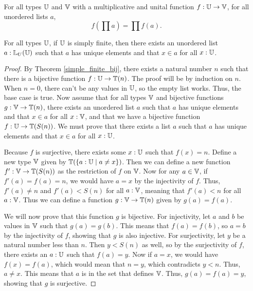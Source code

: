 \documentclass[../../math.tex]{subfiles}
\begin{document}
\begin{theorem} \label{ulist_prod_homo}
    For all types $\mathbb{U}$ and $\mathbb{V}$ with a multiplicative and unital function $f :
    \mathbb{U} \to \mathbb{V}$, for all unordered lists $a$,
    \[
        f\left( \prod a \right) = \prod f(a).
    \]
\end{theorem}

\begin{theorem} \label{ulist_finite}
    For all types $\mathbb{U}$, if $\mathbb{U}$ is simply finite, then there exists an unordered
    list $a : \mathbb{L}_U(\mathbb{U})$ such that $a$ has unique elements and that $x \in a$ for
    all $x : \mathbb{U}$.
\end{theorem}
\begin{proof}
    By Theorem \ref{simple_finite_bij}, there exists a natural number $n$ such
    that there is a bijective function $f : \mathbb{U} \to \mathbb{T}(n)$.  The proof will be by
    induction on $n$.  When $n = 0$, there can't be any values in $\mathbb{U}$, so the
    empty list works.  Thus, the base case is true.  Now assume that for all
    types $\mathbb{V}$ and bijective functions $g : \mathbb{V} \to \mathbb{T}(n)$, there exists an
    unordered list $a$ such that $a$ has unique elements and that $x \in a$ for
    all $x : \mathbb{V}$, and that we have a bijective function $f : \mathbb{U} \to \mathbb{T}(S(n))$.
    We must prove that there exists a list $a$ such that $a$ has unique elements
    and that $x \in a$ for all $x : \mathbb{U}$.

    Because $f$ is surjective, there exists some $x : \mathbb{U}$ such that $f(x) = n$.
    Define a new type $\mathbb{V}$ given by $\mathbb{T}(\{a : \mathbb{U} \mid a \neq x\})$.  Then we can
    define a new function $f' : \mathbb{V} \to \mathbb{T}(S(n))$ as the restriction of $f$ on
    $\mathbb{V}$.  Now for any $a \in \mathbb{V}$, if $f'(a) = f(a) = n$, we would have $a = x$
    by the injectivity of $f$.  Thus, $f'(a) \neq n$ and $f'(a) < S(n)$ for all
    $a : \mathbb{V}$, meaning that $f'(a) < n$ for all $a : \mathbb{V}$.  Thus we can define a
    function $g : \mathbb{V} \to \mathbb{T}(n)$ given by $g(a) = f(a)$.

    We will now prove that this function $g$ is bijective.  For injectivity, let
    $a$ and $b$ be values in $\mathbb{V}$ such that $g(a) = g(b)$.  This means that
    $f(a) = f(b)$, so $a = b$ by the injectivity of $f$, showing that $g$ is
    also injective.  For surjectivity, let $y$ be a natural number less than
    $n$.  Then $y < S(n)$ as well, so by the surjectivity of $f$, there exists
    an $a : \mathbb{U}$ such that $f(a) = y$.  Now if $a = x$, we would have $f(x) =
    f(a)$, which would mean that $n = y$, which contradicts $y < n$.  Thus, $a
    \neq x$.  This means that $a$ is in the set that defines $\mathbb{V}$.  Thus, $g(a)
    = f(a) = y$, showing that $g$ is surjective.


\end{proof}
\end{document}
